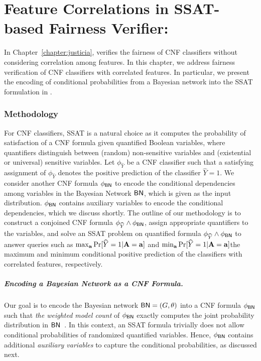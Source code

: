 \appendix

\chapter{Feature Correlations in SSAT-based Fairness Verifier: {\justicia}}
\label{sec:CNF_feature_correlation}
In Chapter~\ref{chapter:justicia}, {\justicia} verifies the fairness of CNF classifiers without considering correlation among features. In this chapter, we address fairness verification of CNF classifiers with correlated features. In particular, we present the encoding of conditional probabilities from a Bayesian network into the SSAT formulation in {\justicia}. 







\subsection*{Methodology}
For CNF classifiers, SSAT is a natural choice as it computes the probability of satisfaction of a CNF formula  given quantified Boolean variables, where quantifiers distinguish between (random) non-sensitive variables and (existential or universal) sensitive variables. Let $ \phi_{\widehat{Y}} $ be a CNF classifier such that a satisfying assignment of $ \phi_{\widehat{Y}} $ denotes the positive prediction of the classifier $ \widehat{Y} = 1 $. We consider another CNF formula $ \phi_{\mathsf{BN}} $ to encode the conditional dependencies among variables in the Bayesian Network $ \mathsf{BN} $, which is given as the input distribution. $ \phi_{\mathsf{BN}} $ contains auxiliary variables to encode the conditional dependencies, which we discuss shortly. The outline of our methodology is to construct a conjoined CNF formula $ \phi_{\widehat{Y}} \wedge \phi_{\mathsf{BN}} $, assign appropriate quantifiers to the variables, and solve an SSAT problem on quantified formula $ \phi_{\widehat{Y}} \wedge \phi_{\mathsf{BN}} $ to answer queries such as $ \max_{\mathbf{a}} \Pr[\widehat{Y} = 1 | \mathbf{A} = \mathbf{a}] $ and $ \min_{\mathbf{a}} \Pr[\widehat{Y} = 1 | \mathbf{A} = \mathbf{a}] $\textemdash the maximum and minimum conditional positive prediction of the classifiers with correlated features, respectively.




\paragraph{Encoding a Bayesian Network as a CNF Formula.}\label{sec:BN_to_CNF}
Our goal is to encode the Bayesian network $ \mathsf{BN} = (G, \theta) $ into a CNF formula $ \phi_{\mathsf{BN}} $ such that \textit{the weighted model count} of $ \phi_{\mathsf{BN}} $ exactly computes the joint probability distribution in $ \mathsf{BN} $~\cite{chavira2008probabilistic}.  In this context, an SSAT formula trivially does not allow conditional probabilities of randomized quantified variables. Hence, $ \phi_{\mathsf{BN}} $ contains additional \textit{auxiliary variables} to capture the conditional probabilities, as discussed next.


